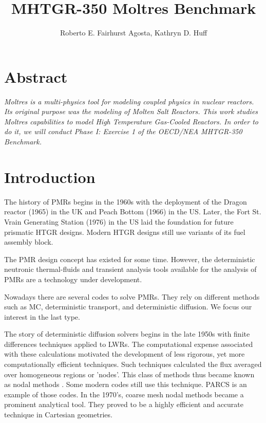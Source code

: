 \documentclass{anstrans}
\title{MHTGR-350 Moltres Benchmark}
\author{Roberto E. Fairhurst Agosta, Kathryn D. Huff}
\institute{
University of Illinois at Urbana-Champaign, Dept. of Nuclear, Plasma, and Radiological Engineering\\
ref3@illinois.edu
}
\begin{document}

\section{Abstract}

\textit{
Moltres is a multi-physics tool for modeling coupled physics in nuclear reactors.
Its original purpose was the modeling of Molten Salt Reactors.
This work studies Moltres capabilities to model High Temperature Gas-Cooled Reactors.
In order to do it, we will conduct Phase I: Exercise 1 of the OECD/NEA MHTGR-350 Benchmark.
}

\section{Introduction}

The history of \glspl{PMR} begins in the 1960s with the deployment of the Dragon reactor (1965) in the \gls{UK} and Peach Bottom (1966) in the \gls{US}.
Later, the Fort St. Vrain Generating Station (1976) in the \gls{US} laid the foundation for future prismatic \gls{HTGR} designs.
Modern \gls{HTGR} designs still use variants of its fuel assembly block.

The \gls{PMR} design concept has existed for some time.
However, the deterministic neutronic thermal-fluids and transient analysis tools available for the analysis of \glspl{PMR} are a technology under development.

Nowadays there are several codes to solve \glspl{PMR}.
They rely on different methods such as \gls{MC}, deterministic transport, and deterministic diffusion.
We focus our interest in the last type.

The story of deterministic diffusion solvers begins in the late 1950s with finite differences techniques applied to \glspl{LWR}.
The computational expense associated with these calculations motivated the development of less rigorous, yet more computationally efficient techniques.
Such techniques calculated the flux averaged over homogeneous regions or 'nodes'.
This class of methods thus became known as nodal methods \cite{lawrence_progress_1986}.
Some modern codes still use this technique. PARCS \cite{downar_parcs_2004} is an example of those codes.
In the 1970's, coarse mesh nodal methods became a prominent analytical tool.
They proved to be a highly efficient and accurate technique in Cartesian geometries.
\end{document}
